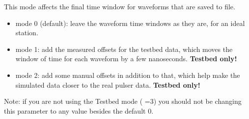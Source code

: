 \documentclass[a4paper,10pt]{article}
\newcommand{\p}[1]{\texttt{\StrSubstitute{#1}{ }{\char`_\hspace{0.5pt}}} \xspace}
\newcommand{\tb}[1]{{\color{red}\textbf{#1}}}
\begin{document}
This mode affects the final time window for waveforms that are saved to file. 

\begin{itemize}
 
 \item mode 0 (default): leave the waveform time windows as they are, for an ideal station. 
 
 \item mode 1: add the measured offsets for the testbed data, which moves the window of time for each waveform by a few nanoseconds. \tb{Testbed only!}
 
 \item mode 2: add some manual offsets in addition to that, which help make the simulated data closer to the real pulser data. \tb{Testbed only!}
 
\end{itemize}

Note: if you are not using the Testbed mode (\p{DETECTOR}=3) you should not be changing this parameter to any value besides the default 0. 

\end{document}
